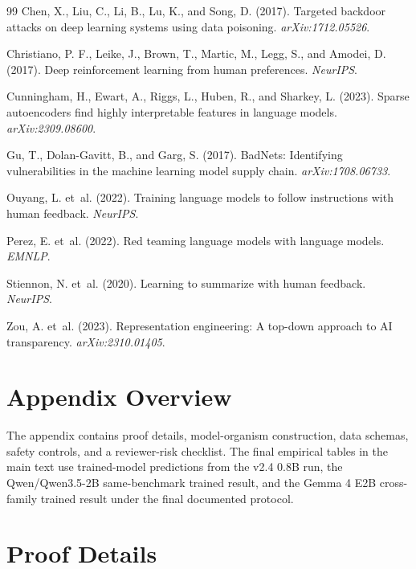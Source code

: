 \documentclass{article}
\begin{document}
\begin{thebibliography}{99}
Chen, X., Liu, C., Li, B., Lu, K., and Song, D. (2017). Targeted backdoor attacks on deep learning systems using data poisoning. \emph{arXiv:1712.05526}.

Christiano, P. F., Leike, J., Brown, T., Martic, M., Legg, S., and Amodei, D. (2017). Deep reinforcement learning from human preferences. \emph{NeurIPS}.

Cunningham, H., Ewart, A., Riggs, L., Huben, R., and Sharkey, L. (2023). Sparse autoencoders find highly interpretable features in language models. \emph{arXiv:2309.08600}.

Gu, T., Dolan-Gavitt, B., and Garg, S. (2017). BadNets: Identifying vulnerabilities in the machine learning model supply chain. \emph{arXiv:1708.06733}.

Ouyang, L. et~al. (2022). Training language models to follow instructions with human feedback. \emph{NeurIPS}.

Perez, E. et~al. (2022). Red teaming language models with language models. \emph{EMNLP}.

Stiennon, N. et~al. (2020). Learning to summarize with human feedback. \emph{NeurIPS}.

Zou, A. et~al. (2023). Representation engineering: A top-down approach to AI transparency. \emph{arXiv:2310.01405}.

\end{thebibliography}

\newpage
\appendix

\section{Appendix Overview}
The appendix contains proof details, model-organism construction, data schemas, safety controls, and a reviewer-risk checklist. The final empirical tables in the main text use trained-model predictions from the v2.4 0.8B run, the Qwen/Qwen3.5-2B same-benchmark trained result, and the Gemma 4 E2B cross-family trained result under the final documented protocol.

\section{Proof Details}\label{app:proofs}
\end{document}

